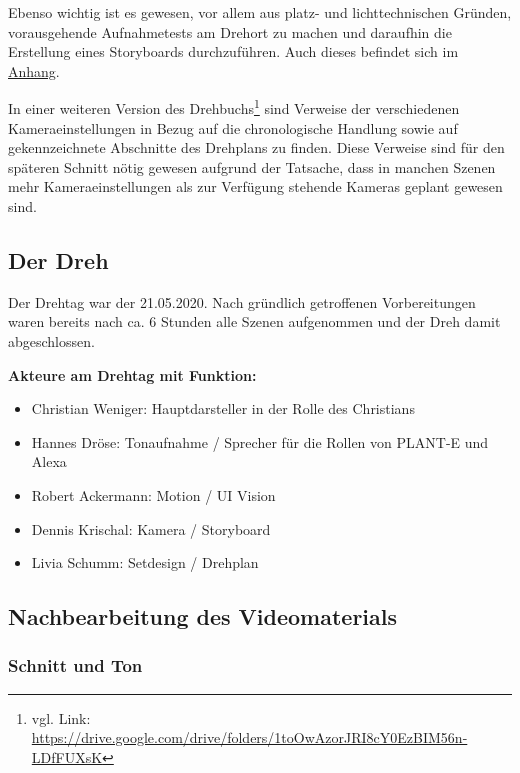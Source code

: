 Ebenso wichtig ist es gewesen, vor allem aus platz- und lichttechnischen
Gründen, vorausgehende Aufnahmetests am Drehort zu machen und daraufhin
die Erstellung eines Storyboards durchzuführen. Auch dieses befindet
sich im \protect\hyperlink{anhang}{Anhang}.

In einer weiteren Version des Drehbuchs\footnote{vgl. Link:
  \url{https://drive.google.com/drive/folders/1toOwAzorJRI8cY0EzBIM56n-LDfFUXsK}}
sind Verweise der verschiedenen Kameraeinstellungen in Bezug auf die
chronologische Handlung sowie auf gekennzeichnete Abschnitte des
Drehplans zu finden. Diese Verweise sind für den späteren Schnitt nötig
gewesen aufgrund der Tatsache, dass in manchen Szenen mehr
Kameraeinstellungen als zur Verfügung stehende Kameras geplant gewesen
sind.

\hypertarget{der-dreh}{%
\subsection{Der Dreh}\label{der-dreh}}

Der Drehtag war der 21.05.2020. Nach gründlich getroffenen
Vorbereitungen waren bereits nach ca. 6 Stunden alle Szenen aufgenommen
und der Dreh damit abgeschlossen.

\textbf{Akteure am Drehtag mit Funktion:}

\begin{itemize}
\tightlist
\item
  Christian Weniger: Hauptdarsteller in der Rolle des Christians
\item
  Hannes Dröse: Tonaufnahme / Sprecher für die Rollen von PLANT-E und
  Alexa
\item
  Robert Ackermann: Motion / UI Vision
\item
  Dennis Krischal: Kamera / Storyboard
\item
  Livia Schumm: Setdesign / Drehplan
\end{itemize}

\hypertarget{nachbearbeitung-des-videomaterials}{%
\subsection{Nachbearbeitung des
Videomaterials}\label{nachbearbeitung-des-videomaterials}}

\hypertarget{schnitt-und-ton}{%
\subsubsection{Schnitt und Ton}\label{schnitt-und-ton}}

